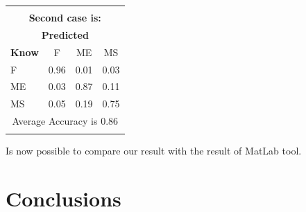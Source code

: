 \documentclass[12pt]{article} %
\begin{document}
\begin{minipage}{0.5\textwidth}
\begin{center}
\begin{tabular}{l|c|c|c|}
\multicolumn{4}{c}{}\\
 \multicolumn{4}{c}{ \textbf{Second case is:}}\\
 \multicolumn{4}{c}{ \textbf{ Predicted}}\\
 \textbf{Know}&F&ME&MS\\ \hline\hline
F   &0.96&0.01&0.03\\
ME &0.03&0.87&0.11\\
MS &0.05&0.19&0.75\\
\multicolumn{4}{c}{Average Accuracy is 0.86}\\
\multicolumn{4}{c}{}\\
\end{tabular}
\end{center}
\end{minipage}
Is now possible to compare our result with the result of MatLab tool.

\newpage

\section {Conclusions}
\end{document}
